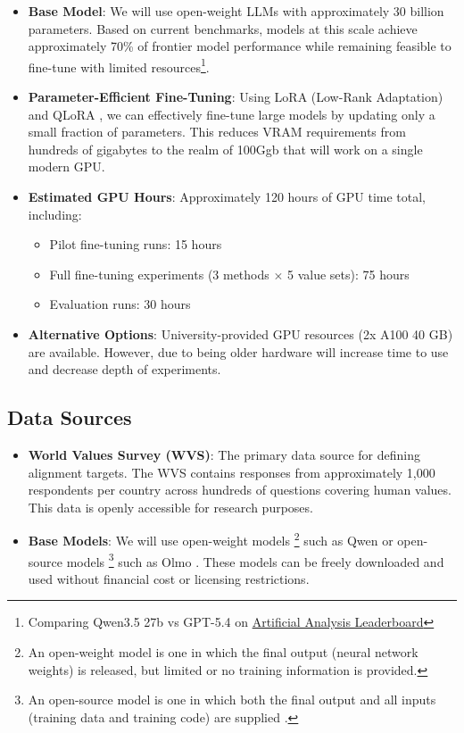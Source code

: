 \documentclass[11pt, a4paper]{article}
\begin{document}
\begin{itemize}
	\item \textbf{Base Model}: We will use open-weight LLMs with approximately 30 billion parameters. Based on current benchmarks, models at this scale achieve approximately 70\% of frontier model performance while remaining feasible to fine-tune with limited resources\footnote{Comparing Qwen3.5 27b vs GPT-5.4 on \href{https://artificialanalysis.ai/leaderboards/models}{Artificial Analysis Leaderboard}}.
	\item \textbf{Parameter-Efficient Fine-Tuning}: Using LoRA (Low-Rank Adaptation) \cite{huLoRALowRankAdaptation2021} and QLoRA \cite{dettmersQLoRAEfficientFinetuning2023}, we can effectively fine-tune large models by updating only a small fraction of parameters. This reduces VRAM requirements from hundreds of gigabytes to the realm of 100Ggb that will work on a single modern GPU.
	\item \textbf{Estimated GPU Hours}: Approximately 120 hours of GPU time total, including:
	      \begin{itemize}
		      \item Pilot fine-tuning runs: 15 hours
		      \item Full fine-tuning experiments (3 methods $\times$ 5 value sets): 75 hours
		      \item Evaluation runs: 30 hours
	      \end{itemize}
	\item \textbf{Alternative Options}: University-provided GPU resources (2x A100 40 GB) are available. However, due to being older hardware will increase time to use and decrease depth of experiments.
\end{itemize}

\subsection{Data Sources}

\begin{itemize}
	\item \textbf{World Values Survey (WVS)}: The primary data source for defining alignment targets. The WVS contains responses from approximately 1,000 respondents per country across hundreds of questions covering human values. This data is openly accessible for research purposes.
	\item \textbf{Base Models}: We will use open-weight models \footnote{An open-weight model is one in which the final output (neural network weights) is released, but limited or no training information is provided.} such as Qwen \cite{qwen3.5} or open-source models \footnote{An open-source model is one in which both the final output and all inputs (training data and training code) are supplied \cite{OpenSourceAI}.} such as Olmo \cite{olmo2025olmo3}. These models can be freely downloaded and used without financial cost or licensing restrictions.
\end{itemize}
\end{document}
